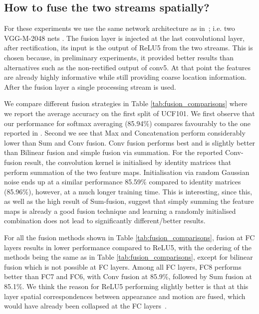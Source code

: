 \documentclass[10pt,twocolumn,letterpaper]{article}
\begin{document}
\subsection{How to fuse the two streams spatially?}

\label{sec:eval_ts_fusion}
For these experiments we use the same network architecture as in~\cite{Simonyan14b}; i.e. two VGG-M-2048 nets \cite{chatfield2014devil}. The fusion layer is injected at the last convolutional layer, after rectification, \ie its input is the output of ReLU5 from the two streams. This is chosen because, in preliminary experiments, it provided better results than alternatives such as the non-rectified output of conv5. At that point the features are already highly informative while still providing coarse location information. 
After the fusion layer a single processing stream is used. 


We compare different fusion strategies in Table \ref{tab:fusion_comparisons} where we report the average accuracy on the first split of UCF101. We first observe that our performance for softmax averaging (85.94\%) compares favourably to the one reported in \cite{Simonyan14b}. Second we see that Max and Concatenation perform considerably lower than Sum and Conv fusion. Conv fusion performs best and is slightly better than Bilinear fusion and simple fusion via summation. For the reported Conv-fusion result, the convolution kernel  is initialised by identity matrices that perform summation of the two feature maps. Initialisation via random Gaussian noise ends up at a similar performance 85.59\% compared to identity matrices (85.96\%), however, at a much longer training time. This is interesting, since this, as well as the high result of Sum-fusion, suggest that simply summing the feature maps is already a good fusion technique and learning a randomly initialised combination does not lead to significantly different/better results.

For all the fusion methods shown in Table \ref{tab:fusion_comparisons}, fusion  at FC layers results in lower performance compared to ReLU5, with the ordering of the methods being the same as in Table \ref{tab:fusion_comparisons}, except for bilinear fusion which is not possible at FC layers. Among all FC layers, FC8 performs better than FC7 and FC6, with Conv fusion at 85.9\%, followed by Sum fusion at 85.1\%.  We think the reason for ReLU5 performing slightly better is that at this layer spatial correspondences between appearance and motion are fused, which would have already been collapsed at the FC 
layers~\cite{Mahendran15}.
\end{document}
